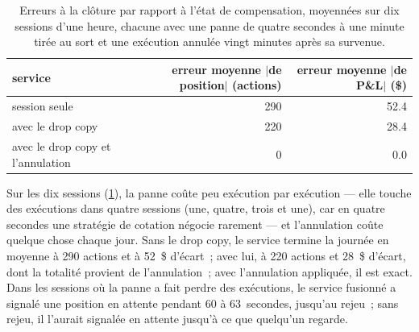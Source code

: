 \begin{table}[ht]
\centering\small
\begin{tabular}{lrr}
\toprule
service & erreur moyenne $|$de position$|$ (actions) & erreur moyenne $|$de P\&L$|$ (\$) \\
\midrule
session seule & 290 & 52.4 \\
avec le drop copy & 220 & 28.4 \\
avec le drop copy et l'annulation & 0 & 0.0 \\
\bottomrule
\end{tabular}
\caption{Erreurs à la clôture par rapport à l'état de compensation, moyennées sur dix sessions d'une heure, chacune avec une panne de quatre secondes à une
minute tirée au sort et une exécution annulée vingt minutes après sa survenue.}\label{tab:pl:position-and-pnl-services:close}
\end{table}

Sur les dix sessions (\cref{tab:pl:position-and-pnl-services:close}), la panne coûte peu exécution par exécution --- elle touche
des exécutions dans quatre sessions (une, quatre, trois et une), car en quatre secondes une stratégie de cotation négocie rarement --- et l'annulation coûte
quelque chose chaque jour. Sans le drop copy, le service termine la journée en moyenne à 290 actions et à 52~\$ d'écart~; avec lui, à 220 actions et 28~\$ d'écart, dont
la totalité provient de l'annulation~; avec l'annulation appliquée, il est exact. Dans les sessions où la panne a fait perdre des exécutions, le service fusionné a signalé une position en attente pendant 60 à
63~secondes, jusqu'au rejeu~; sans rejeu, il l'aurait signalée en attente jusqu'à ce que quelqu'un regarde.

